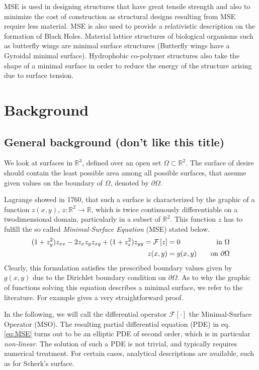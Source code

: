 \documentclass[11pt]{scrartcl}
\newcommand{\mSurf}[1]{\ensuremath{\mathcal{F}\left[#1\right]}}
\begin{document}
MSE is used in designing structures that have great tensile strength and also to minimize the cost of construction as structural designs resulting from MSE require less material. MSE is also used to provide a relativistic description on the formation of Black Holes. Material lattice structures of biological organisms such as butterfly wings are minimal surface structures (Butterfly wings have a Gyroidal minimal surface). Hydrophobic  co-polymer structures also take the shape of a minimal surface in order to reduce the energy of the structure arising due to surface tension. 
\section{Background}
\subsection{General background (don't like this title)}
We look at surfaces in $ \mathbb{R}^3 $, defined over an open set $\Omega \subset \mathbb{R}^2$. 
The surface of desire should contain the least possible area among all possible surfaces, that assume given values on the boundary of $\Omega$, denoted by $\partial \Omega$. \cite{Sakai1976}

Lagrange showed in 1760, that such a surface is characterized by the graphic of a function $z(x,y)$, $z: \mathbb{R}^2 \to \mathbb{R} $, which is twice continuously differentiable on a twodimensional domain, particularly in a subset of $\mathbb{R}^2$.
This function $z$ has to fulfill the so called \textit{Minimal-Surface Equation} (MSE) stated below.
\begin{align}\label{eq:MSE}
	(1+z_y^2) z_{xx} - 2 z_x z_y z_{xy} + (1+z_x^2)z_{yy} = \mSurf{z} &= 0 \quad &\text{in } \Omega \\
	z(x,y) &= g(x,y) \quad &\text{on } \partial \Omega \notag
\end{align}
Clearly, this formulation satisfies the prescribed boundary values given by $g(x,y)$ due to the Dirichlet boundary condition on $\partial\Omega$.
As to why the graphic of functions solving this equation describes a minimal surface, we refer to the literature. For example \cite{Sakai1976} gives a very straightforward proof.

In the following, we will call the differential operator $\mSurf{\cdot}$ the Minimal-Surface Operator (MSO). The resulting partial differential equation (PDE) in eq. \eqref{eq:MSE} turns out to be an elliptic PDE of second order, which is in particular \textit{non-linear}. The solution of such a PDE is not trivial, and typically requires numerical treatment. For certain cases, analytical descriptions are available, such as for Scherk's surface.
\end{document}
